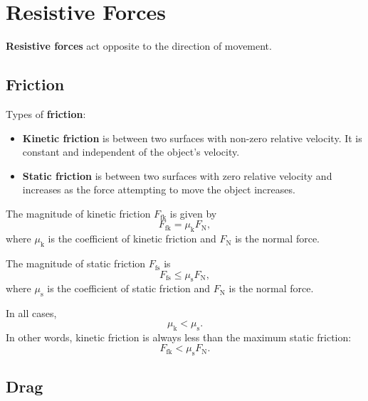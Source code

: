 \section{Resistive Forces}

\textbf{Resistive forces} act opposite to the direction of movement.

\subsection{Friction}

Types of \textbf{friction}:
\begin{itemize}
    \item
        \textbf{Kinetic friction} is between two surfaces with
        non-zero relative velocity.
        It is constant and independent of the object's velocity.
    \item
        \textbf{Static friction} is between two surfaces with zero
        relative velocity
        and increases as the force attempting to move the object increases.
\end{itemize}

The magnitude of kinetic friction \(F_\mathrm{fk}\) is given by
\begin{equation}
    F_\mathrm{fk} = \mu_\mathrm{k} F_\mathrm{N},
\end{equation}
where \(\mu_\mathrm{k}\) is the coefficient of kinetic friction
and \(F_\mathrm{N}\) is the normal force.

The magnitude of static friction \(F_\mathrm{fs}\) is
\begin{equation}
    F_\mathrm{fs} \le \mu_\mathrm{s} F_\mathrm{N},
\end{equation}
where \(\mu_\mathrm{s}\) is the coefficient of static friction
and \(F_\mathrm{N}\) is the normal force.

In all cases,
\begin{equation}
    \mu_\mathrm{k} < \mu_\mathrm{s}.
\end{equation}
In other words, kinetic friction is always less than the maximum
static friction:
\begin{equation}
    F_\mathrm{fk} < \mu_\mathrm{s} F_\mathrm{N}.
\end{equation}

\subsection{Drag}

